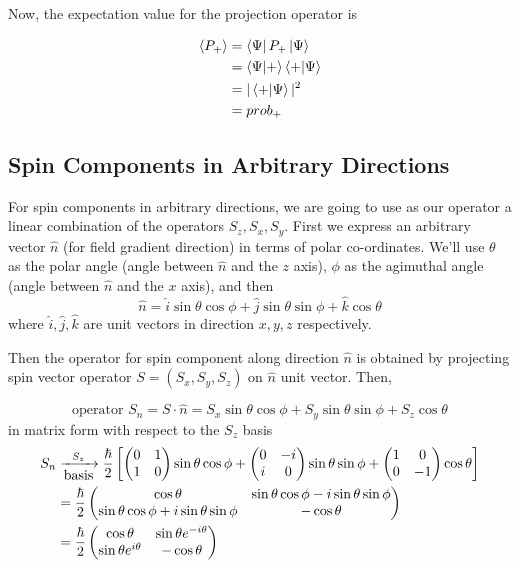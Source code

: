 \documentclass[english, 11pt]{article}
\begin{document}
      Now, the expectation value for the projection operator is

      \begin{align*}
        \E{P_+} & = \bra{\Psi}P_+\kpsi \\
                & = \braket{\Psi}{+}\braket{+}{\Psi} \\
                & = |\braket{+}{\Psi}|^2 \\
                & = prob_+
      \end{align*}

    \subsection{Spin Components in Arbitrary Directions}

      For spin components in arbitrary directions, we are going to use as our operator a linear combination of the operators $S_z, S_x, S_y$. First we express an arbitrary vector $\hat{n}$ (for field gradient direction) in terms of polar co-ordinates. We'll use $\theta$ as the polar angle (angle between $\hat{n}$ and the $z$ axis), $\phi$ as the agimuthal angle (angle between $\hat{n}$ and the $x$ axis), and then
      \[ \hat{n} = \hat{i}\sin\theta\cos\phi + \hat{j}\sin\theta\sin\phi + \hat{k}\cos\theta  \]
      where $\hat{i}, \hat{j}, \hat{k}$ are unit vectors in direction $x, y,z$ respectively.
      \newline

      Then the operator for spin component along direction $\hat{n}$ is obtained by projecting spin vector operator $S = (S_x,S_y,S_z)$ on $\hat{n}$ unit vector. Then,

      \[ \mbox{operator } S_n = S\cdot\hat{n} = S_x\sin\theta\cos\phi + S_y\sin\theta\sin\phi + S_z\cos\theta \]
      in matrix form with respect to the $S_z$ basis
      \begin{align*}
        S_n & \xrightarrow[\mbox{basis}]{S_z} \frac{\hbar}{2} \left[ \left(\begin{matrix}0 & 1 \\ 1 & 0\end{matrix}\right)\sin\theta\cos\phi + \left(\begin{matrix}0 & -i \\ i & 0\end{matrix}\right)\sin\theta\sin\phi + \left(\begin{matrix}1 & 0 \\ 0 & -1\end{matrix}\right)\cos\theta \right] \\
        & = \frac{\hbar}{2}\left(\begin{matrix}\cos\theta & \sin\theta\cos\phi - i\sin\theta\sin\phi \\ \sin\theta\cos\phi+i\sin\theta\sin\phi & - \cos\theta\end{matrix}\right) \\
        & = \frac{\hbar}{2}\left(\begin{matrix}\cos\theta & \sin\theta e^{-i\theta}\\ \sin\theta e^{i\theta} & -\cos\theta\end{matrix}\right)
      \end{align*}
\end{document}
